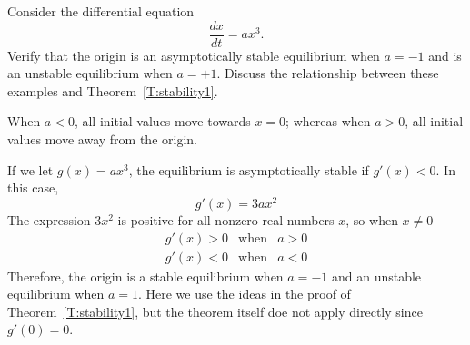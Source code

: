 \documentclass{ximera}
\begin{document}
\begin{computerExercise} \label{c3.3.5}
Consider the differential equation
\[
\frac{dx}{dt} = a x^3.
\]
Verify that the origin is an asymptotically
stable equilibrium when $a = -1$ and is an unstable
equilibrium when $a = +1$. Discuss the relationship
between these examples and Theorem~\ref{T:stability1}.

\begin{solution}

\ans When $a < 0$, all initial values move towards $x = 0$; whereas
when $a > 0$, all initial values move away from the origin. 

\soln If we let $g(x) = a x^3$, the equilibrium is asymptotically stable if $g'(x) < 0$.  In this case,
\[
g'(x) = 3a x^2
\]
The expression $3x^2$ is positive for all nonzero real numbers $x$, so
when $x \neq 0$
\[ \begin{array}{ccc}
g'(x) > 0 & \mbox{when} & a > 0 \\
g'(x) < 0 & \mbox{when} & a < 0 \end{array}
\]
Therefore, the origin is a stable equilibrium when $a = -1$ and
an unstable equilibrium when $a = 1$.  Here we use the ideas in the proof of Theorem~\ref{T:stability1}, but the theorem itself doe not apply directly since $g'(0)=0$.

\end{solution}
\end{computerExercise}
\end{document}
